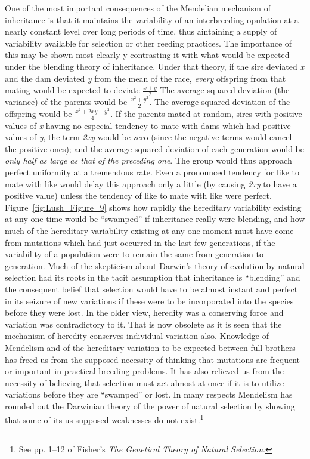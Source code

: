 {
One of the most important consequences of the Mendelian mechanism of inheritance
is that it maintains the variability of an interbreeding opulation at a nearly
constant level over long periods of time, thus aintaining a supply of variability
available for selection or other reeding practices. The importance of this may be
shown most clearly y contrasting it with what would be expected under the blending
theory of inheritance. Under that theory, if the sire deviated \textit{x} and the
dam deviated \textit{y} from the mean of the race, \textit{every} offspring from
that mating would be expected to deviate $\frac{x + y}{2}$ The average squared
deviation (the variance) of the parents would be $\frac{x^2 + y^2}{2}$. The average
squared deviation of the offspring would be $\frac{x^2 + 2xy + y^2}{4}$. If the
parents mated at random, sires with positive values of \textit{x} having no especial
tendency to mate with dams which had positive values of \textit{y}, the term
\textit{2xy} would be zero (since the negative terms would cancel the positive
ones); and the average squared deviation of each generation would be \textit{only
half as large as that of the preceding one}. The group would thus  approach perfect
uniformity at a tremendous rate. Even a pronounced tendency for like to mate with
like would delay this approach only a little (by causing \textit{2xy} to have a
positive value) unless the tendency of like to mate with like were perfect.
Figure~\ref{fig:Lush_Figure_9} shows how rapidly the hereditary variability
existing at any one time would be ``swamped'' if inheritance really were blending,
and how much of the hereditary variability existing at any one moment must have
come from mutations which had just occurred in the last few generations, if the
variability of a population were to remain the same from generation to generation.
Much of the skepticism about Darwin's theory of evolution by natural selection had
its roots in the tacit assumption that inheritance is ``blending'' and the consequent
belief that selection would have to be almost instant and perfect in its seizure of
new variations if these were to be incorporated into the species before they were
lost. In the older view, heredity was a conserving force and variation was contradictory
to it. That is now obsolete as it is seen that the mechanism of heredity conserves
individual variation also. Knowledge of Mendelism and of the hereditary variation to be
expected between full brothers has freed us from the supposed necessity of thinking that
mutations are frequent or important in practical breeding problems. It has also relieved
us from the necessity of believing that selection must act almost at once if it is to
utilize variations before they are ``swamped'' or lost. In many respects Mendelism has
rounded out the Darwinian theory of the power of natural selection by showing that some
of its us supposed weaknesses do not exist.\footnote{See pp. 1--12 of Fisher's
\textit{The Genetical Theory of Natural Selection}.}

}
